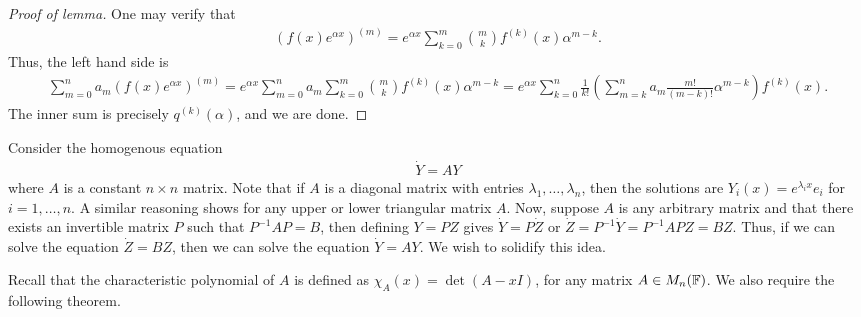 \begin{proof}[Proof of lemma]
    One may verify that
    \begin{align}
        (f(x) e^{\alpha x})^{(m)} = e^{\alpha x} \sum_{k=0}^{m} \binom{m}{k} f^{(k)}(x) \alpha^{m-k}.
    \end{align}
    Thus, the left hand side is
    \begin{align}
        \sum_{m=0}^{n} a_{m} (f(x) e^{\alpha x})^{(m)} = e^{\alpha x} \sum_{m=0}^{n} a_{m} \sum_{k=0}^{m} \binom{m}{k} f^{(k)}(x) \alpha^{m-k} = e^{\alpha x} \sum_{k=0}^{n} \frac{1}{k!} \left( \sum_{m=k}^{n} a_{m} \frac{m!}{(m-k)!} \alpha^{m-k} \right) f^{(k)}(x).
    \end{align}
    The inner sum is precisely $q^{(k)}(\alpha)$, and we are done.
\end{proof}

\noindent Consider the homogenous equation
\begin{align}
    \dot{Y} = AY
\end{align}
where $A$ is a constant $n \times n$ matrix. Note that if $A$ is a diagonal matrix with entries $\lambda_{1},\ldots,\lambda_{n}$, then the solutions are $Y_{i}(x) = e^{\lambda_{i} x} e_{i}$ for $i = 1,\ldots,n$. A similar reasoning shows for any upper or lower triangular matrix $A$. Now, suppose $A$ is any arbitrary matrix and that there exists an invertible matrix $P$ such that $P^{-1}AP = B$, then defining $Y = PZ$ gives $\dot{Y} = P\dot{Z}$ or $\dot{Z} = P^{-1} \dot{Y} = P^{-1} A P Z = BZ$. Thus, if we can solve the equation $\dot{Z} = BZ$, then we can solve the equation $\dot{Y} = AY$. We wish to solidify this idea.

Recall that the characteristic polynomial of $A$ is defined as $\chi_{A}(x) = \det(A - xI)$, for any matrix $A \in M_{n}(\mathbb{F})$. We also require the following theorem.

